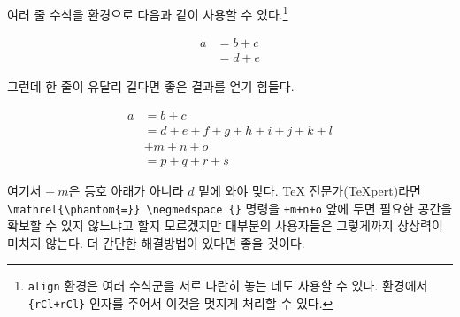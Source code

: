 여러 줄 수식을  환경으로 다음과 같이 사용할 수 있다.\footnote{%
  \texttt{align} 환경은 여러 수식군을 서로 나란히 놓는 데도 사용할 수 있다.
   환경에서 \texttt{\{rCl+rCl\}} 인자를 주어서 이것을 멋지게 처리할 수 있다.
}
\begin{examplek}
\begin{align}
  a & = b + c \\
  & = d + e
\end{align}
\end{examplek}

그런데 한 줄이 유달리 길다면 좋은 결과를 얻기 힘들다.
\begin{examplek}
\begin{align}
  a & = b + c \\
  & = d + e + f + g + h + i 
  + j + k + l \nonumber \\
  & + m + n + o \\
  & = p + q + r + s
\end{align}
\end{examplek}
\noindent 여기서 $+\:m$은 등호 아래가 아니라 $d$ 밑에 와야 맞다. 
\TeX{} 전문가(\TeX{}pert)라면 \verb+\mathrel{\phantom{=}} \negmedspace {}+ 명령을
\verb|+m+n+o| 앞에 두면 필요한 공간을 확보할 수 있지 않느냐고 할지 모르겠지만 대부분의 사용자들은 
그렇게까지 상상력이 미치지 않는다. 더 간단한 해결방법이 있다면 좋을 것이다.

